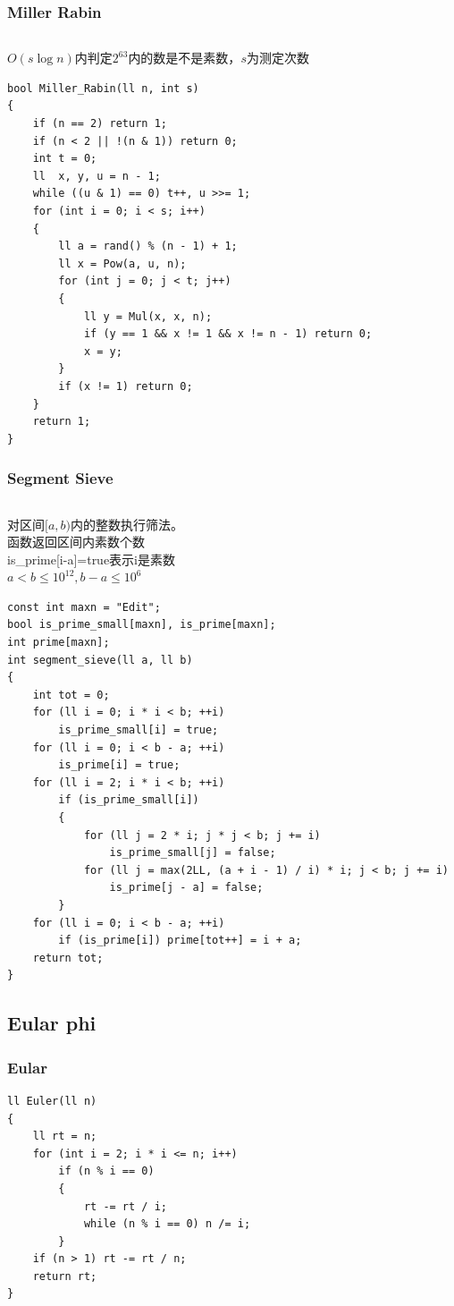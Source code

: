 \documentclass[twoside]{article}
\begin{document}
\subsubsection{Miller Rabin}
\begin{lstlisting}
\end{lstlisting}
$O(s\log n)$内判定$2^{63}$内的数是不是素数，$s$为测定次数
\begin{lstlisting}
bool Miller_Rabin(ll n, int s)
{
    if (n == 2) return 1;
    if (n < 2 || !(n & 1)) return 0;
    int t = 0;
    ll  x, y, u = n - 1;
    while ((u & 1) == 0) t++, u >>= 1;
    for (int i = 0; i < s; i++)
    {
        ll a = rand() % (n - 1) + 1;
        ll x = Pow(a, u, n);
        for (int j = 0; j < t; j++)
        {
            ll y = Mul(x, x, n);
            if (y == 1 && x != 1 && x != n - 1) return 0;
            x = y;
        }
        if (x != 1) return 0;
    }
    return 1;
}
\end{lstlisting}
\subsubsection{Segment Sieve}
\begin{lstlisting}
\end{lstlisting}
对区间$[a,b)$内的整数执行筛法。\\
函数返回区间内素数个数\\
is\_prime[i-a]=true表示i是素数\\
$a<b \le 10^{12}, b-a \le 10^6$
\begin{lstlisting}
const int maxn = "Edit";
bool is_prime_small[maxn], is_prime[maxn];
int prime[maxn];
int segment_sieve(ll a, ll b)
{
    int tot = 0;
    for (ll i = 0; i * i < b; ++i)
        is_prime_small[i] = true;
    for (ll i = 0; i < b - a; ++i)
        is_prime[i] = true;
    for (ll i = 2; i * i < b; ++i)
        if (is_prime_small[i])
        {
            for (ll j = 2 * i; j * j < b; j += i)
                is_prime_small[j] = false;
            for (ll j = max(2LL, (a + i - 1) / i) * i; j < b; j += i)
                is_prime[j - a] = false;
        }
    for (ll i = 0; i < b - a; ++i)
        if (is_prime[i]) prime[tot++] = i + a;
    return tot;
}
\end{lstlisting}
\subsection{Eular phi}
\subsubsection{Eular}
\begin{lstlisting}
ll Euler(ll n)
{
    ll rt = n;
    for (int i = 2; i * i <= n; i++)
        if (n % i == 0)
        {
            rt -= rt / i;
            while (n % i == 0) n /= i;
        }
    if (n > 1) rt -= rt / n;
    return rt;
}
\end{lstlisting}
\end{document}
